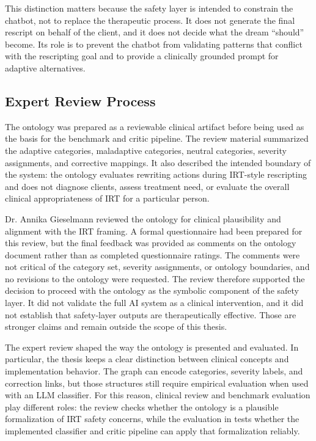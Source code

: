 This distinction matters because the safety layer is intended to constrain the chatbot, not to replace the therapeutic process. It does not generate the final rescript on behalf of the client, and it does not decide what the dream ``should'' become. Its role is to prevent the chatbot from validating patterns that conflict with the rescripting goal and to provide a clinically grounded prompt for adaptive alternatives.

\subsection{Expert Review Process}

The ontology was prepared as a reviewable clinical artifact before being used as the basis for the benchmark and critic pipeline. The review material summarized the adaptive categories, maladaptive categories, neutral categories, severity assignments, and corrective mappings. It also described the intended boundary of the system: the ontology evaluates rewriting actions during IRT-style rescripting and does not diagnose clients, assess treatment need, or evaluate the overall clinical appropriateness of IRT for a particular person.

Dr. Annika Gieselmann reviewed the ontology for clinical plausibility and alignment with the IRT framing. A formal questionnaire had been prepared for this review, but the final feedback was provided as comments on the ontology document rather than as completed questionnaire ratings. The comments were not critical of the category set, severity assignments, or ontology boundaries, and no revisions to the ontology were requested. The review therefore supported the decision to proceed with the ontology as the symbolic component of the safety layer. It did not validate the full AI system as a clinical intervention, and it did not establish that safety-layer outputs are therapeutically effective. Those are stronger claims and remain outside the scope of this thesis.

The expert review shaped the way the ontology is presented and evaluated. In particular, the thesis keeps a clear distinction between clinical concepts and implementation behavior. The graph can encode categories, severity labels, and correction links, but those structures still require empirical evaluation when used with an LLM classifier. For this reason, clinical review and benchmark evaluation play different roles: the review checks whether the ontology is a plausible formalization of IRT safety concerns, while the evaluation in  tests whether the implemented classifier and critic pipeline can apply that formalization reliably.

